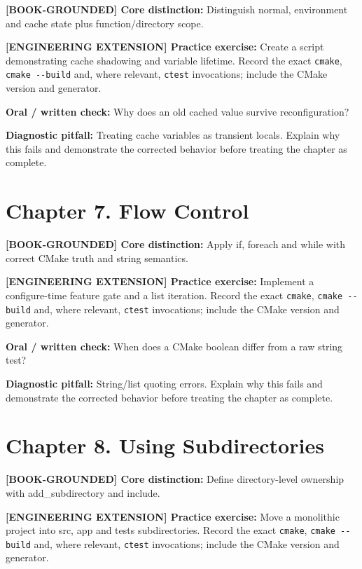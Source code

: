 \documentclass[11pt,letterpaper,oneside]{report}
\providecommand{\passthrough}[1]{#1}
\begin{document}
\textbf{{[}BOOK-GROUNDED{]} Core distinction:} Distinguish normal,
environment and cache state plus function/directory scope.

\textbf{{[}ENGINEERING EXTENSION{]} Practice exercise:} Create a script
demonstrating cache shadowing and variable lifetime. Record the exact
\passthrough{\lstinline!cmake!}, \passthrough{\lstinline!cmake --build!}
and, where relevant, \passthrough{\lstinline!ctest!} invocations;
include the CMake version and generator.

\textbf{Oral / written check:} Why does an old cached value survive
reconfiguration?

\textbf{Diagnostic pitfall:} Treating cache variables as transient
locals. Explain why this fails and demonstrate the corrected behavior
before treating the chapter as complete.

\section{Chapter 7. Flow Control}\label{chapter-7.-flow-control}

\textbf{{[}BOOK-GROUNDED{]} Core distinction:} Apply if, foreach and
while with correct CMake truth and string semantics.

\textbf{{[}ENGINEERING EXTENSION{]} Practice exercise:} Implement a
configure-time feature gate and a list iteration. Record the exact
\passthrough{\lstinline!cmake!}, \passthrough{\lstinline!cmake --build!}
and, where relevant, \passthrough{\lstinline!ctest!} invocations;
include the CMake version and generator.

\textbf{Oral / written check:} When does a CMake boolean differ from a
raw string test?

\textbf{Diagnostic pitfall:} String/list quoting errors. Explain why
this fails and demonstrate the corrected behavior before treating the
chapter as complete.

\section{Chapter 8. Using
Subdirectories}\label{chapter-8.-using-subdirectories}

\textbf{{[}BOOK-GROUNDED{]} Core distinction:} Define directory-level
ownership with add\_subdirectory and include.

\textbf{{[}ENGINEERING EXTENSION{]} Practice exercise:} Move a
monolithic project into src, app and tests subdirectories. Record the
exact \passthrough{\lstinline!cmake!},
\passthrough{\lstinline!cmake --build!} and, where relevant,
\passthrough{\lstinline!ctest!} invocations; include the CMake version
and generator.
\end{document}
